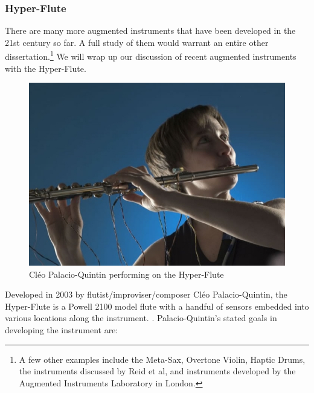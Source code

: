 
\subsubsection{Hyper-Flute}

There are many more augmented instruments that have been developed in the 21st century so far. A full study of them would warrant an entire other dissertation.\footnote{A few other examples include the Meta-Sax, Overtone Violin, Haptic Drums, the instruments discussed by Reid et al\cite{reid2018}, and instruments developed by the Augmented Instruments Laboratory in London.} We will wrap up our discussion of recent augmented instruments with the Hyper-Flute.

\begin{figure}
    \centering
    \includegraphics[scale=0.5]{diagrams/palacio_quintin_cleo.jpg}
    \caption{Cléo Palacio-Quintin performing on the Hyper-Flute}
    \label{fig:hyper-flute}
\end{figure}

Developed in 2003 by flutist/improviser/composer Cléo Palacio-Quintin, the Hyper-Flute is a Powell 2100 model flute with a handful of sensors embedded into various locations along the instrument. \cite{hyper-flute2003}. Palacio-Quintin's stated goals in developing the instrument are: 

